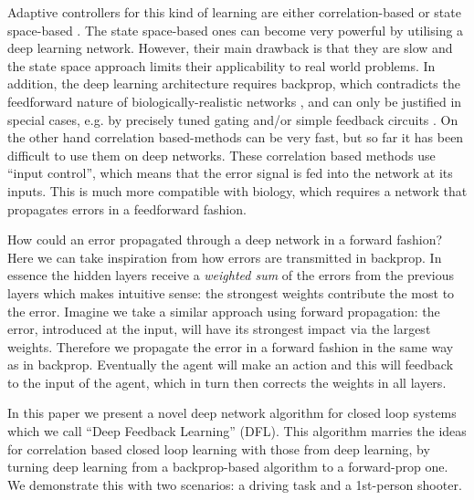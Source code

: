 \documentclass{llncs}
\begin{document}
Adaptive controllers for this kind of learning are either
correlation-based \cite{PorrNecoISO2003,Verschure91} or state
space-based \cite{Dayan1992,Sutton98}. The state space-based ones can
become very powerful by utilising a deep learning network. However,
their main drawback is that they are slow and the state space approach
limits their applicability to real world problems. In addition, the
deep learning architecture requires backprop, which contradicts the
feedforward nature of biologically-realistic networks
\cite{Bennett2000}, and can only be justified in special cases,
e.g. by precisely tuned gating and/or simple feedback circuits
\cite{Lillicrap2016}. On the other hand correlation based-methods can
be very fast, but so far it has been difficult to use them on
deep networks.  These correlation based methods use ``input control'',
which means that the error signal is fed into the network at its
inputs. This is much more compatible with biology, which requires a
network that propagates errors in a feedforward fashion.

How could an error propagated through a deep network in a forward fashion? Here we can
take inspiration from how errors are transmitted in backprop. 
In essence the hidden layers receive a \textsl{weighted sum} of the errors from the
previous layers which makes intuitive sense: the strongest weights
contribute the most to the error. Imagine we take a similar approach using forward propagation: the error, introduced at the input, will have its strongest
impact via the largest weights. Therefore we propagate the error
in a forward fashion in the same way as in backprop. Eventually the agent
will make an action and this will feedback to the input of the agent, which
in turn then corrects the weights in all layers.

In this paper we present a novel deep network algorithm for closed loop systems
which we call ``Deep Feedback Learning'' (DFL). This algorithm marries the
ideas for correlation based closed loop learning with those from deep learning,
by turning deep learning from a backprop-based algorithm to a forward-prop
one. We demonstrate this with two scenarios: a driving task and a 1st-person shooter.
\end{document}

